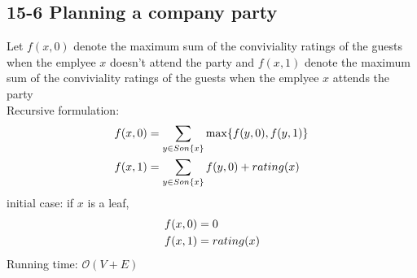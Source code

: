 \subsection*{15-6 Planning a company party}
\noindent Let $f(x, 0)$ denote the maximum sum of the conviviality ratings of the guests when the emplyee $x$ doesn't attend the party and $f(x, 1)$ denote the maximum sum of the conviviality ratings of the guests when the emplyee $x$ attends the party \\
Recursive formulation:
\begin{equation} \notag
\begin{aligned}
	&f(x, 0) = \sum_{y \in Son\{x\}} \max\{f(y, 0), f(y, 1)\} \\
	&f(x, 1) = \sum_{y \in Son\{x\}} f(y, 0) + rating(x)
\end{aligned}
\end{equation}
initial case: if $x$ is a leaf,
\begin{equation} \notag
\begin{aligned}
	&f(x, 0) = 0 \\
	&f(x, 1) = rating(x)
\end{aligned}
\end{equation}
Running time: $\mathcal{O}(V + E)$


